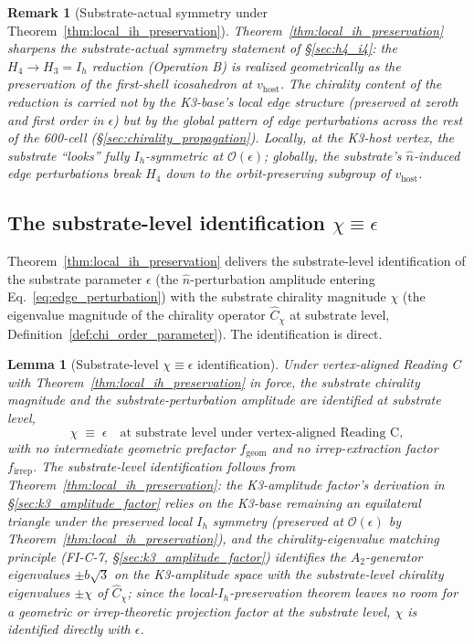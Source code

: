 \documentclass[11pt,letterpaper]{article}
\newtheorem{lemma}[theorem]{Lemma}
\newtheorem{remark}[theorem]{Remark}
\newcommand{\Cchi}{\hat{C}_\chi}
\newcommand{\Hfour}{H_4}
\begin{document}
\begin{remark}[Substrate-actual symmetry under Theorem~\ref{thm:local_ih_preservation}]\label{rem:substrate_actual_symmetry}
Theorem~\ref{thm:local_ih_preservation} sharpens the substrate-actual symmetry statement of \S\ref{sec:h4_i4}: the $\Hfour \to H_3 = I_h$ reduction (Operation B) is realized geometrically as the preservation of the first-shell icosahedron at $v_{\text{host}}$. The chirality content of the reduction is carried not by the K3-base's local edge structure (preserved at zeroth and first order in $\epsilon$) but by the global pattern of edge perturbations across the rest of the 600-cell (\S\ref{sec:chirality_propagation}). Locally, at the K3-host vertex, the substrate ``looks'' fully $I_h$-symmetric at $\mathcal{O}(\epsilon)$; globally, the substrate's $\hat{n}$-induced edge perturbations break $\Hfour$ down to the orbit-preserving subgroup of $v_{\text{host}}$.
\end{remark}

\subsection{The substrate-level identification $\chi \equiv \epsilon$}\label{sec:chi_epsilon_identification}

Theorem~\ref{thm:local_ih_preservation} delivers the substrate-level identification of the substrate parameter $\epsilon$ (the $\hat{n}$-perturbation amplitude entering Eq.~\eqref{eq:edge_perturbation}) with the substrate chirality magnitude $\chi$ (the eigenvalue magnitude of the chirality operator $\Cchi$ at substrate level, Definition~\ref{def:chi_order_parameter}). The identification is direct.

\begin{lemma}[Substrate-level $\chi \equiv \epsilon$ identification]\label{lem:chi_epsilon}
Under vertex-aligned Reading C with Theorem~\ref{thm:local_ih_preservation} in force, the substrate chirality magnitude and the substrate-perturbation amplitude are identified at substrate level,
\begin{equation}\label{eq:chi_epsilon_identification}
\chi \;\equiv\; \epsilon \quad \text{at substrate level under vertex-aligned Reading C},
\end{equation}
with no intermediate geometric prefactor $f_{\text{geom}}$ and no irrep-extraction factor $f_{\text{irrep}}$. The substrate-level identification follows from Theorem~\ref{thm:local_ih_preservation}: the K3-amplitude factor's derivation in \S\ref{sec:k3_amplitude_factor} relies on the K3-base remaining an equilateral triangle under the preserved local $I_h$ symmetry (preserved at $\mathcal{O}(\epsilon)$ by Theorem~\ref{thm:local_ih_preservation}), and the chirality-eigenvalue matching principle (FI-C-7, \S\ref{sec:k3_amplitude_factor}) identifies the $A_2$-generator eigenvalues $\pm b\sqrt{3}$ on the K3-amplitude space with the substrate-level chirality eigenvalues $\pm \chi$ of $\Cchi$; since the local-$I_h$-preservation theorem leaves no room for a geometric or irrep-theoretic projection factor at the substrate level, $\chi$ is identified directly with $\epsilon$.
\end{lemma}
\end{document}
